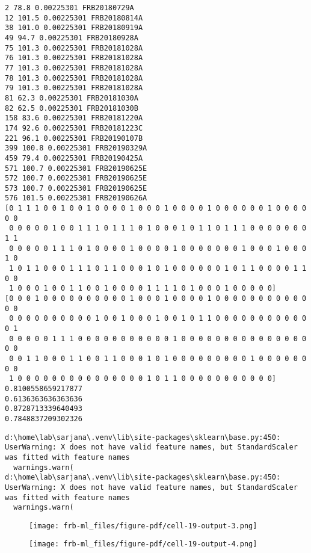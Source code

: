\documentclass[
  letterpaper,
  DIV=11,
  numbers=noendperiod]{scrartcl}
\begin{document}
\begin{verbatim}
2 78.8 0.00225301 FRB20180729A
12 101.5 0.00225301 FRB20180814A
38 101.0 0.00225301 FRB20180919A
49 94.7 0.00225301 FRB20180928A
75 101.3 0.00225301 FRB20181028A
76 101.3 0.00225301 FRB20181028A
77 101.3 0.00225301 FRB20181028A
78 101.3 0.00225301 FRB20181028A
79 101.3 0.00225301 FRB20181028A
81 62.3 0.00225301 FRB20181030A
82 62.5 0.00225301 FRB20181030B
158 83.6 0.00225301 FRB20181220A
174 92.6 0.00225301 FRB20181223C
221 96.1 0.00225301 FRB20190107B
399 100.8 0.00225301 FRB20190329A
459 79.4 0.00225301 FRB20190425A
571 100.7 0.00225301 FRB20190625E
572 100.7 0.00225301 FRB20190625E
573 100.7 0.00225301 FRB20190625E
576 101.5 0.00225301 FRB20190626A
[0 1 1 1 0 0 1 0 0 1 0 0 0 0 1 0 0 0 1 0 0 0 0 1 0 0 0 0 0 0 1 0 0 0 0 0 0
 0 0 0 0 0 1 0 0 1 1 1 0 1 1 1 0 1 0 0 0 1 0 1 1 0 1 1 1 0 0 0 0 0 0 0 1 1
 0 0 0 0 0 1 1 1 0 1 0 0 0 0 1 0 0 0 0 1 0 0 0 0 0 0 0 1 0 0 0 1 0 0 0 1 0
 1 0 1 1 0 0 0 1 1 1 0 1 1 0 0 0 1 0 1 0 0 0 0 0 0 1 0 1 1 0 0 0 0 1 1 0 0
 1 0 0 0 1 0 0 1 1 0 0 1 0 0 0 0 1 1 1 1 0 1 0 0 0 1 0 0 0 0 0]
[0 0 0 1 0 0 0 0 0 0 0 0 0 0 1 0 0 0 1 0 0 0 0 1 0 0 0 0 0 0 0 0 0 0 0 0 0
 0 0 0 0 0 0 0 0 0 0 1 0 0 1 0 0 0 1 0 0 1 0 1 1 0 0 0 0 0 0 0 0 0 0 0 0 1
 0 0 0 0 0 1 1 1 0 0 0 0 0 0 0 0 0 0 0 1 0 0 0 0 0 0 0 0 0 0 0 0 0 0 0 0 0
 0 0 1 1 0 0 0 1 1 0 0 1 1 0 0 0 1 0 1 0 0 0 0 0 0 0 0 0 1 0 0 0 0 0 0 0 0
 1 0 0 0 0 0 0 0 0 0 0 0 0 0 0 0 1 0 1 1 0 0 0 0 0 0 0 0 0 0 0]
0.8100558659217877
0.6136363636363636
0.8728713339640493
0.7848837209302326
\end{verbatim}

\begin{verbatim}
d:\home\lab\sarjana\.venv\lib\site-packages\sklearn\base.py:450: UserWarning: X does not have valid feature names, but StandardScaler was fitted with feature names
  warnings.warn(
d:\home\lab\sarjana\.venv\lib\site-packages\sklearn\base.py:450: UserWarning: X does not have valid feature names, but StandardScaler was fitted with feature names
  warnings.warn(
\end{verbatim}

\begin{figure}[H]

{\centering \texttt{[image: frb-ml\_files/figure-pdf/cell-19-output-3.png]}

}

\end{figure}

\begin{figure}[H]

{\centering \texttt{[image: frb-ml\_files/figure-pdf/cell-19-output-4.png]}

}

\end{figure}
\end{document}
